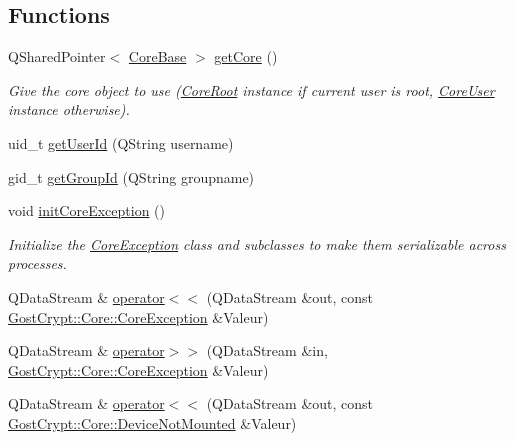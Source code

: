 \subsection*{Functions}
\begin{DoxyCompactItemize}
\item 
Q\+Shared\+Pointer$<$ \hyperlink{class_gost_crypt_1_1_core_1_1_core_base}{Core\+Base} $>$ \hyperlink{namespace_gost_crypt_1_1_core_aebee4c3e0812331b85f018855887dfde}{get\+Core} ()
\begin{DoxyCompactList}\small\item\em Give the core object to use (\hyperlink{class_gost_crypt_1_1_core_1_1_core_root}{Core\+Root} instance if current user is root, \hyperlink{class_gost_crypt_1_1_core_1_1_core_user}{Core\+User} instance otherwise). \end{DoxyCompactList}\item 
uid\+\_\+t \hyperlink{namespace_gost_crypt_1_1_core_af5a4d81b86fc0ab8033cb685f9cac213}{get\+User\+Id} (Q\+String username)
\item 
gid\+\_\+t \hyperlink{namespace_gost_crypt_1_1_core_a8ed446713a9144223305012b80e4395d}{get\+Group\+Id} (Q\+String groupname)
\item 
void \hyperlink{namespace_gost_crypt_1_1_core_a89e961f21dc6df65d86cec0196e18919}{init\+Core\+Exception} ()
\begin{DoxyCompactList}\small\item\em Initialize the \hyperlink{class_gost_crypt_1_1_core_1_1_core_exception}{Core\+Exception} class and subclasses to make them serializable across processes. \end{DoxyCompactList}\item 
Q\+Data\+Stream \& \hyperlink{namespace_gost_crypt_1_1_core_af862fa26ba84703c0ac089d1250db141}{operator$<$$<$} (Q\+Data\+Stream \&out, const \hyperlink{class_gost_crypt_1_1_core_1_1_core_exception}{Gost\+Crypt\+::\+Core\+::\+Core\+Exception} \&Valeur)
\item 
Q\+Data\+Stream \& \hyperlink{namespace_gost_crypt_1_1_core_a1ff67feb7d22a2bbc87ac98667457856}{operator$>$$>$} (Q\+Data\+Stream \&in, \hyperlink{class_gost_crypt_1_1_core_1_1_core_exception}{Gost\+Crypt\+::\+Core\+::\+Core\+Exception} \&Valeur)
\item 
Q\+Data\+Stream \& \hyperlink{namespace_gost_crypt_1_1_core_a9c48f375029f746e7a901d76905c8e6a}{operator$<$$<$} (Q\+Data\+Stream \&out, const \hyperlink{class_gost_crypt_1_1_core_1_1_device_not_mounted}{Gost\+Crypt\+::\+Core\+::\+Device\+Not\+Mounted} \&Valeur)
\item 

\end{DoxyCompactItemize}
